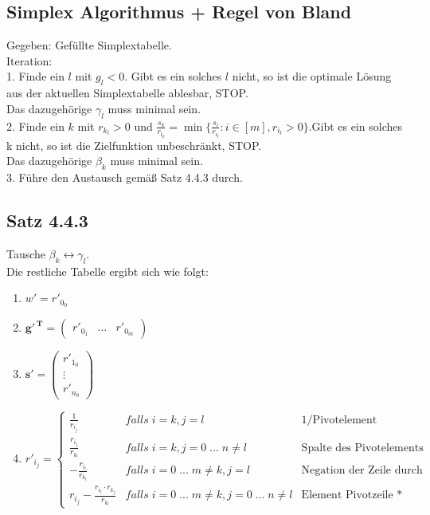 \documentclass[]{article}
\begin{document}
\subsection{Simplex Algorithmus + Regel von Bland}
Gegeben: Gefüllte Simplextabelle.\\
Iteration:\\
1. Finde ein $ l $ mit $ g_l < 0 $. Gibt es ein solches $ l $ nicht, so ist die optimale
Lösung aus der aktuellen Simplextabelle ablesbar, STOP.\\Das dazugehörige $ \gamma_l $ muss minimal sein.\\
2. Finde ein $ k $ mit $ r_{k_l} >0 $ und $ \frac{s_k}{r_{l_k}}  =\min\{\frac{s_i}{r_{i_l}} :i\in [m],r_{i_l} >0\} $.Gibt es ein solches k nicht, so ist die Zielfunktion unbeschränkt, STOP. \\Das dazugehörige $ \beta_k $ muss minimal sein.\\
3. Führe den Austausch gemäß Satz 4.4.3 durch.\\
\subsection*{Satz 4.4.3}
Tausche $ \beta_k \leftrightarrow \gamma_l $.\\Die restliche Tabelle ergibt sich wie folgt:\\
\begin{enumerate}
	\item $ w'=r'_{0_0} $
	\item $ \mathbf{g'^{\,T}} =\begin{pmatrix}r'_{0_1} & \dots & r'_{0_m}\end{pmatrix} $
	\item $ \mathbf{s'}=\begin{pmatrix}r'_{1_0}\\\vdots\\r'_{n_0}\end{pmatrix} $
	\item 	$ r'_{i_j}=\left\{\begin{array}{lc|c|}\frac1{r_{i_j}}&falls\;i=k,j=l &\text{1/Pivotelement}\\
	\frac{r_{i_j}}{r_{k_l}}&falls\;i=k,j=0\;...\;n\neq l&\text{Spalte des Pivotelements durch Pivotelement}\\
	-\frac{r_{i_l}}{r_{k_l}}&falls\;i=0\;...\;m\neq k,j=l&\text{Negation der Zeile durch Pivotelement}\\
	r_{i_j}-\frac{r_{i_l}\cdot r_{k_j}}{r_{k_l}}&falls\;i=0\;...\;m\neq k,j=0\;...\;n\neq l&\text{Element Pivotzeile * Pivotspalte / Pivotelement}\end{array}\right. $
\end{enumerate}
\newpage
\end{document}
